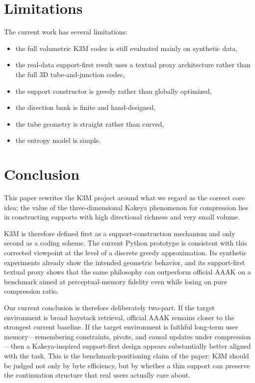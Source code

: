 \documentclass[11pt]{article}
\begin{document}
\section{Limitations}
The current work has several limitations:
\begin{itemize}[leftmargin=1.5em]
\item the full volumetric K3M codec is still evaluated mainly on synthetic data,
\item the real-data support-first result uses a textual proxy architecture rather than the full 3D tube-and-junction codec,
\item the support constructor is greedy rather than globally optimized,
\item the direction bank is finite and hand-designed,
\item the tube geometry is straight rather than curved,
\item the entropy model is simple.
\end{itemize}

\section{Conclusion}
This paper rewrites the K3M project around what we regard as the correct core idea: the value of the three-dimensional Kakeya phenomenon for compression lies in constructing supports with high directional richness and very small volume.

K3M is therefore defined first as a support-construction mechanism and only second as a coding scheme. The current Python prototype is consistent with this corrected viewpoint at the level of a discrete greedy approximation. Its synthetic experiments already show the intended geometric behavior, and its support-first textual proxy shows that the same philosophy can outperform official AAAK on a benchmark aimed at perceptual-memory fidelity even while losing on pure compression ratio.

Our current conclusion is therefore deliberately two-part. If the target environment is broad haystack retrieval, official AAAK remains closer to the strongest current baseline. If the target environment is faithful long-term user memory---remembering constraints, pivots, and causal updates under compression---then a Kakeya-inspired support-first design appears substantially better aligned with the task. This is the benchmark-positioning claim of the paper: K3M should be judged not only by byte efficiency, but by whether a thin support can preserve the continuation structure that real users actually care about.
\end{document}
